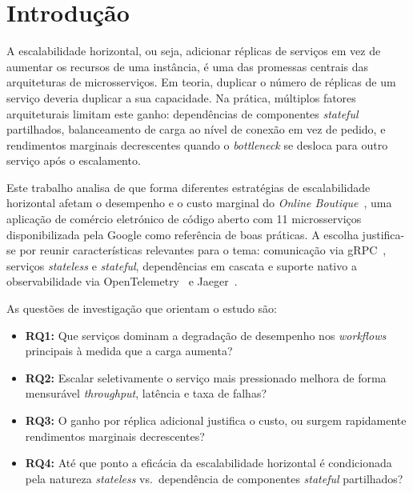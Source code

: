 \documentclass[manuscript,oneside]{acmart}
\begin{document}

\maketitle

\section{Introdução}

A escalabilidade horizontal, ou seja, adicionar réplicas de serviços em vez de aumentar os recursos de uma instância, é uma das promessas centrais das arquiteturas de microsserviços. Em teoria, duplicar o número de réplicas de um serviço deveria duplicar a sua capacidade. Na prática, múltiplos fatores arquiteturais limitam este ganho: dependências de componentes \textit{stateful} partilhados, balanceamento de carga ao nível de conexão em vez de pedido, e rendimentos marginais decrescentes quando o \textit{bottleneck} se desloca para outro serviço após o escalamento.

Este trabalho analisa de que forma diferentes estratégias de escalabilidade horizontal afetam o desempenho e o custo marginal do \textit{Online Boutique}~\cite{onlineboutique}, uma aplicação de comércio eletrónico de código aberto com 11 microsserviços disponibilizada pela Google como referência de boas práticas. A escolha justifica-se por reunir características relevantes para o tema: comunicação via gRPC~\cite{grpc}, serviços \textit{stateless} e \textit{stateful}, dependências em cascata e suporte nativo a observabilidade via OpenTelemetry~\cite{otel} e Jaeger~\cite{jaeger}.

As questões de investigação que orientam o estudo são:
\begin{itemize}
  \item \textbf{RQ1:} Que serviços dominam a degradação de desempenho nos \textit{workflows} principais à medida que a carga aumenta?
  \item \textbf{RQ2:} Escalar seletivamente o serviço mais pressionado melhora de forma mensurável \textit{throughput}, latência e taxa de falhas?
  \item \textbf{RQ3:} O ganho por réplica adicional justifica o custo, ou surgem rapidamente rendimentos marginais decrescentes?
  \item \textbf{RQ4:} Até que ponto a eficácia da escalabilidade horizontal é condicionada pela natureza \textit{stateless} vs.\ dependência de componentes \textit{stateful} partilhados?
\end{itemize}
\end{document}
